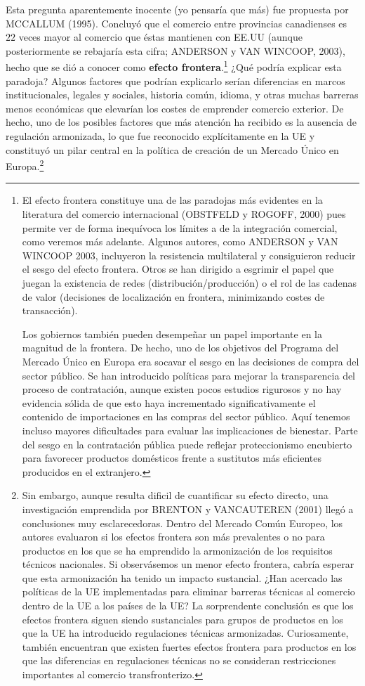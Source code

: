\documentclass[10pt,a4paper]{article}
\begin{document}
Esta pregunta aparentemente inocente (yo pensaría que más) fue propuesta por MCCALLUM (1995). Concluyó que el comercio entre provincias canadienses es $22$ veces mayor al comercio que éstas mantienen con EE.UU (aunque posteriormente se rebajaría esta cifra; ANDERSON y VAN WINCOOP, 2003), hecho que se dió a conocer como \textbf{efecto frontera}.\footnote{%
    El efecto frontera constituye una de las paradojas más evidentes en la literatura del comercio internacional (OBSTFELD y ROGOFF, 2000) pues permite ver de forma inequívoca los límites a de la integración comercial, como veremos más adelante. Algunos autores, como ANDERSON y VAN WINCOOP 2003, incluyeron la resistencia multilateral y consiguieron reducir el sesgo del efecto frontera. Otros se han dirigido a esgrimir el papel que juegan la existencia de redes (distribución/producción) o el rol de las cadenas de valor (decisiones de localización en frontera, minimizando costes de transacción).

Los gobiernos también pueden desempeñar un papel importante en la magnitud de la frontera. De hecho, uno de los objetivos del Programa del Mercado Único en Europa era socavar el sesgo en las decisiones de compra del sector público. Se han introducido políticas para mejorar la transparencia del proceso de contratación, aunque existen pocos estudios rigurosos y no hay evidencia sólida de que esto haya incrementado significativamente el contenido de importaciones en las compras del sector público. Aquí tenemos incluso mayores dificultades para evaluar las implicaciones de bienestar. Parte del sesgo en la contratación pública puede reflejar proteccionismo encubierto para favorecer productos domésticos frente a sustitutos más eficientes producidos en el extranjero.
} ¿Qué podría explicar esta paradoja? Algunos factores que podrían explicarlo serían diferencias en marcos institucionales, legales y sociales, historia común, idioma, y otras muchas barreras menos económicas que elevarían los costes de emprender comercio exterior. De hecho, uno de los posibles factores que más atención ha recibido es la ausencia de regulación armonizada, lo que fue reconocido explícitamente en la UE y constituyó un pilar central en la política de creación de un Mercado Único en Europa.\footnote{%
    Sin embargo, aunque resulta dificil de cuantificar su efecto directo, una investigación emprendida por BRENTON y VANCAUTEREN (2001) llegó a conclusiones muy esclarecedoras. Dentro del Mercado Común Europeo, los autores evaluaron si los efectos frontera son más prevalentes o no para productos en los que se ha emprendido la armonización de los requisitos técnicos nacionales. Si observásemos un menor efecto frontera, cabría esperar que esta armonización ha tenido un impacto sustancial. ¿Han acercado las políticas de la UE implementadas para eliminar barreras técnicas al comercio dentro de la UE a los países de la UE? La sorprendente conclusión es que los efectos frontera siguen siendo sustanciales para grupos de productos en los que la UE ha introducido regulaciones técnicas armonizadas. Curiosamente, también encuentran que existen fuertes efectos frontera para productos en los que las diferencias en regulaciones técnicas no se consideran restricciones importantes al comercio transfronterizo.
}
\end{document}
